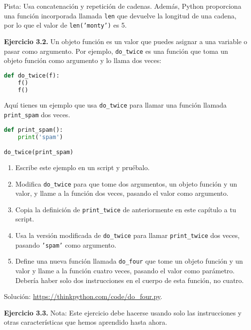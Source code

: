 Pista: Usa concatenación y repetición de cadenas. Además, Python proporciona una función incorporada llamada \texttt{len} que devuelve la longitud de una cadena, por lo que el valor de \texttt{len('monty')} es 5.

\textbf{Ejercicio 3.2.} Un objeto función es un valor que puedes asignar a una variable o pasar como argumento. Por ejemplo, \texttt{do\_twice} es una función que toma un objeto función como argumento y lo llama dos veces:

\begin{lstlisting}[language=Python]
def do_twice(f):
    f()
    f()
\end{lstlisting}

Aquí tienes un ejemplo que usa \texttt{do\_twice} para llamar una función llamada \texttt{print\_spam} dos veces.

\begin{lstlisting}[language=Python]
def print_spam():
    print('spam')

do_twice(print_spam)
\end{lstlisting}

\begin{enumerate}
\item Escribe este ejemplo en un script y pruébalo.

\item Modifica \texttt{do\_twice} para que tome dos argumentos, un objeto función y un valor, y llame a la función dos veces, pasando el valor como argumento.

\item Copia la definición de \texttt{print\_twice} de anteriormente en este capítulo a tu script.

\item Usa la versión modificada de \texttt{do\_twice} para llamar \texttt{print\_twice} dos veces, pasando \texttt{'spam'} como argumento.

\item Define una nueva función llamada \texttt{do\_four} que tome un objeto función y un valor y llame a la función cuatro veces, pasando el valor como parámetro. Debería haber solo dos instrucciones en el cuerpo de esta función, no cuatro.
\end{enumerate}

Solución: \href{https://thinkpython.com/code/do\_four.py}{https://thinkpython.com/code/do\_four.py}.

\textbf{Ejercicio 3.3.} Nota: Este ejercicio debe hacerse usando solo las instrucciones y otras características que hemos aprendido hasta ahora.

